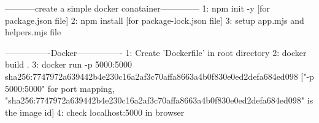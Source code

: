 -----------create a simple docker conatainer--------------
1: npm init -y  [for package.json file]
2: npm install [for package-lock.json file]
3: setup app.mjs and helpers.mjs file


----------------Docker----------------
1: Create 'Dockerfile' in root directory
2: docker build .
3: docker run -p 5000:5000 sha256:7747972a639442b4e230c16a2af3c70affa8663a4b0f830e0ed2defa684ed098 ["-p 5000:5000" for port mapping, "sha256:7747972a639442b4e230c16a2af3c70affa8663a4b0f830e0ed2defa684ed098" is the image id]
4: check localhost:5000 in browser